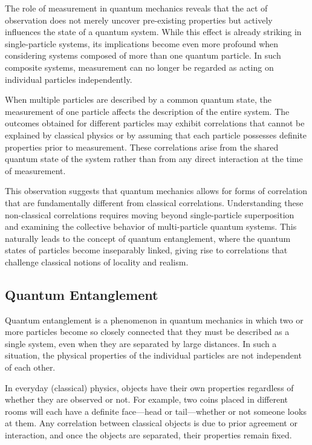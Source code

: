 \documentclass[14pt,a4paper]{extarticle}
\begin{document}
The role of measurement in quantum mechanics reveals that the act of observation does not merely uncover pre-existing properties but actively influences the state of a quantum system. While this effect is already striking in single-particle systems, its implications become even more profound when considering systems composed of more than one quantum particle. In such composite systems, measurement can no longer be regarded as acting on individual particles independently.

When multiple particles are described by a common quantum state, the measurement of one particle affects the description of the entire system. The outcomes obtained for different particles may exhibit correlations that cannot be explained by classical physics or by assuming that each particle possesses definite properties prior to measurement. These correlations arise from the shared quantum state of the system rather than from any direct interaction at the time of measurement.

This observation suggests that quantum mechanics allows for forms of correlation that are fundamentally different from classical correlations. Understanding these non-classical correlations requires moving beyond single-particle superposition and examining the collective behavior of multi-particle quantum systems. This naturally leads to the concept of quantum entanglement, where the quantum states of particles become inseparably linked, giving rise to correlations that challenge classical notions of locality and realism.

\subsection{Quantum Entanglement}
Quantum entanglement is a phenomenon in quantum mechanics in which two or more particles become so closely connected that they must be described as a single system, even when they are separated by large distances. In such a situation, the physical properties of the individual particles are not independent of each other.

In everyday (classical) physics, objects have their own properties regardless of whether they are observed or not. For example, two coins placed in different rooms will each have a definite face—head or tail—whether or not someone looks at them. Any correlation between classical objects is due to prior agreement or interaction, and once the objects are separated, their properties remain fixed.
\end{document}

